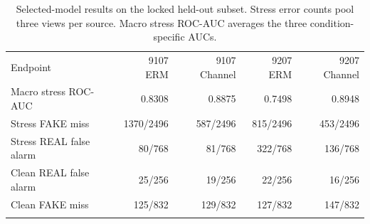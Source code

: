 \begin{table}[t]
\caption{Selected-model results on the locked held-out subset. Stress error counts pool three views per source. Macro stress ROC-AUC averages the three condition-specific AUCs.}\label{tab:heldout-endpoints}
\centering
\small
\begin{tabular}{@{}lrrrr@{}}
\toprule
Endpoint & 9107 ERM & 9107 Channel & 9207 ERM & 9207 Channel \\
\colrule
Macro stress ROC-AUC & 0.8308 & 0.8875 & 0.7498 & 0.8948 \\
Stress FAKE miss & 1370/2496 & 587/2496 & 815/2496 & 453/2496 \\
Stress REAL false alarm & 80/768 & 81/768 & 322/768 & 136/768 \\
Clean REAL false alarm & 25/256 & 19/256 & 22/256 & 16/256 \\
Clean FAKE miss & 125/832 & 129/832 & 127/832 & 147/832 \\
\botrule
\end{tabular}
\end{table}
